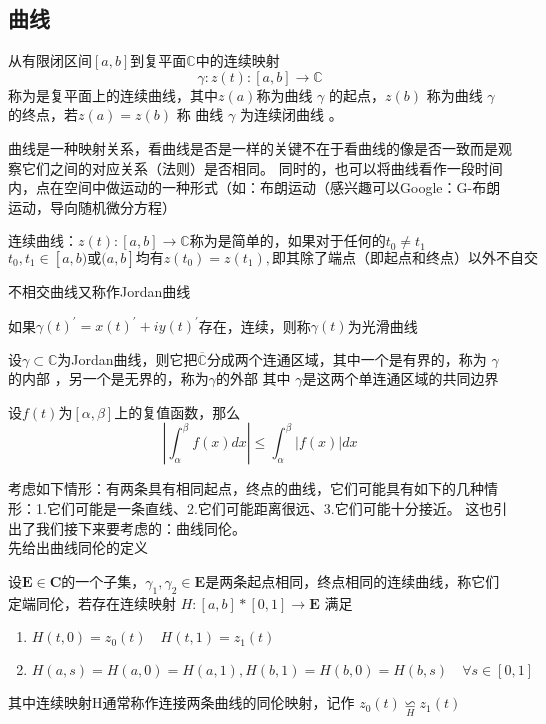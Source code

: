 \subsection*{曲线}
\begin{definition}
    从有限闭区间\(\left[a,b\right]\)到复平面\(\mathbb{C}\)中的连续映射
    \[\gamma :z(t): \left[a,b\right] \rightarrow \mathbb{C}\]
    称为是复平面上的连续曲线，其中\(z(a)\)称为曲线 \(\gamma\) 的起点，\(z(b)\) 称为曲线 \(\gamma\) 的终点，若\(z(a)=z(b)\)
    称 曲线 \(\gamma\) 为连续闭曲线 。
\end{definition}
\begin{remark}
    曲线是一种映射关系，看曲线是否是一样的关键不在于看曲线的像是否一致而是观察它们之间的对应关系（法则）是否相同。
    同时的，也可以将曲线看作一段时间内，点在空间中做运动的一种形式（如：布朗运动（感兴趣可以Google：G-布朗运动，导向随机微分方程）
\end{remark}
\begin{definition}[不相交曲线]
    连续曲线：\(z(t): \left[a,b\right] \rightarrow \mathbb{C}\)称为是简单的，如果对于任何的\(t_0 \neq t_1 \)
    \[t_0,t_1 \in [a,b) \text{或} (a,b] \text{均有} z(t_0)=z(t_1) , \text{即其除了端点（即起点和终点）以外不自交}\]
\end{definition}
不相交曲线又称作Jordan曲线
\begin{definition}[光滑曲线]
    如果\({\gamma(t)}^{'}={x(t)}^{'}+i{y(t)}^{'}\)存在，连续，则称\(\gamma(t)\)为光滑曲线
\end{definition}
\begin{theorem}[Jordan定理]
    设\(\gamma \subset \mathbb{C}\)为Jordan曲线，则它把\(\overline{\mathbb{C}}\)分成两个连通区域，其中一个是有界的，称为
    \(\gamma \)的内部 ，另一个是无界的，称为\(\gamma\)的外部 其中 \(\gamma\)是这两个单连通区域的共同边界
\end{theorem}
\begin{lemma}
    设\(f(t)\)为\(\left[\alpha,\beta\right]\)上的复值函数，那么
    \[|\int_{\alpha}^{\beta}f(x) dx| \leq \int_{\alpha}^{\beta}|f(x)|dx\]
\end{lemma}
考虑如下情形：有两条具有相同起点，终点的曲线，它们可能具有如下的几种情形：1.它们可能是一条直线、2.它们可能距离很远、3.它们可能十分接近。
这也引出了我们接下来要考虑的：曲线同伦。\\
先给出曲线同伦的定义
\begin{definition}
   设\(\mathbf{E} \in \mathbf{C}\)的一个子集，\(\gamma_1,\gamma_2 \in \mathbf{E}\)是两条起点相同，终点相同的连续曲线，称它们定端同伦，若存在连续映射 \(H: \left[a,b\right] * \left[0,1\right] \rightarrow \mathbf{E}\)
    满足
    \begin{enumerate}
        \item \(H(t,0) =z_0(t) \quad H(t,1)=z_1(t)\) \\
        \item \(H(a,s)=H(a,0)=H(a,1),H(b,1)=H(b,0)=H(b,s) \quad \forall s \in [0,1]\)
    \end{enumerate} 
其中连续映射H通常称作连接两条曲线的同伦映射，记作 \(z_0(t) \mathop{\backsimeq}\limits_H z_1(t)\)
\end{definition}
